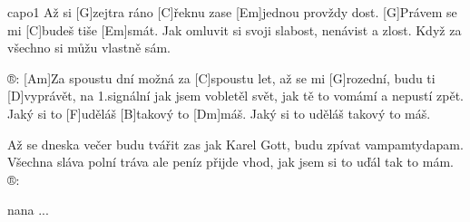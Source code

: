 \hfill capo1
Až si [G]zejtra ráno [C]\null řeknu zase
[Em]jednou provždy dost.
[G]Právem se mi [C]budeš tiše [Em]smát.
Jak omluvit si svoji slabost, nenávist a zlost.
Když za všechno si můžu vlastně sám.

®: [Am]Za spoustu dní možná za [C]spoustu let,
až se mi [G]rozední, budu ti [D]vyprávět,
na 1.signální jak jsem vobletěl svět,
jak tě to vomámí a nepustí zpět.
Jaký si to [F]uděláš [B]takový to [Dm]máš.
Jaký si to uděláš takový to máš.

Až se dneska večer budu tvářit zas jak Karel Gott,
budu zpívat vampamtydapam.
Všechna sláva polní tráva ale peníz přijde vhod,
jak jsem si to uďál tak to mám. ®:

nana ...


